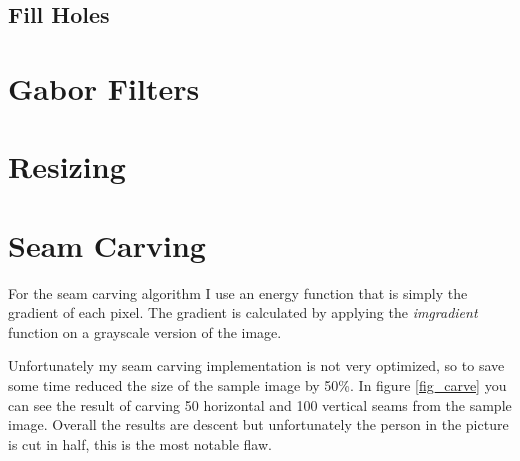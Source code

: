 \documentclass[12pt]{article}
\begin{document}
\subsection{Fill Holes}


\section{Gabor Filters}

\section{Resizing}

\section{}

\section{}

\section{Seam Carving}

For the seam carving algorithm I use an energy function that is simply the gradient of each pixel. The gradient is calculated by applying the \textit{imgradient} function on a grayscale version of the image.

Unfortunately my seam carving implementation is not very optimized, so to save some time reduced the size of the sample image by 50\%.
In figure \ref{fig_carve} you can see the result of carving 50 horizontal and 100 vertical seams from the sample image. Overall the results are descent but unfortunately the person in the picture is cut in half, this is the most notable flaw. 
\end{document}
